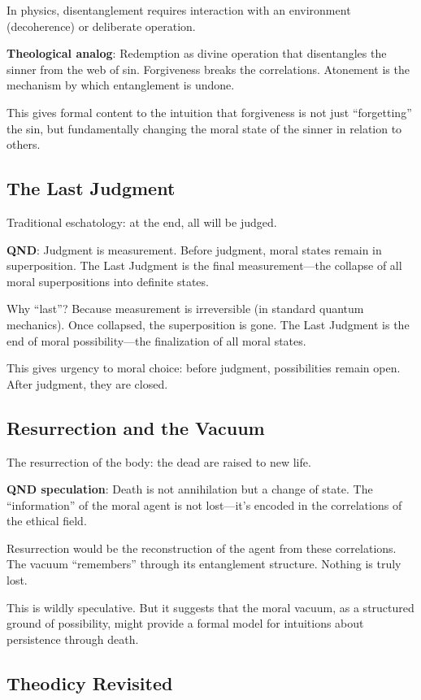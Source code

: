\documentclass[12pt]{article}
\begin{document}
In physics, disentanglement requires interaction with an environment (decoherence) or deliberate operation.

\textbf{Theological analog}: Redemption as divine operation that disentangles the sinner from the web of sin. Forgiveness breaks the correlations. Atonement is the mechanism by which entanglement is undone.

This gives formal content to the intuition that forgiveness is not just ``forgetting'' the sin, but fundamentally changing the moral state of the sinner in relation to others.

\subsection{The Last Judgment}

Traditional eschatology: at the end, all will be judged.

\textbf{QND}: Judgment is measurement. Before judgment, moral states remain in superposition. The Last Judgment is the final measurement---the collapse of all moral superpositions into definite states.

Why ``last''? Because measurement is irreversible (in standard quantum mechanics). Once collapsed, the superposition is gone. The Last Judgment is the end of moral possibility---the finalization of all moral states.

This gives urgency to moral choice: before judgment, possibilities remain open. After judgment, they are closed.

\subsection{Resurrection and the Vacuum}

The resurrection of the body: the dead are raised to new life.

\textbf{QND speculation}: Death is not annihilation but a change of state. The ``information'' of the moral agent is not lost---it's encoded in the correlations of the ethical field.

Resurrection would be the reconstruction of the agent from these correlations. The vacuum ``remembers'' through its entanglement structure. Nothing is truly lost.

This is wildly speculative. But it suggests that the moral vacuum, as a structured ground of possibility, might provide a formal model for intuitions about persistence through death.

\subsection{Theodicy Revisited}
\end{document}
